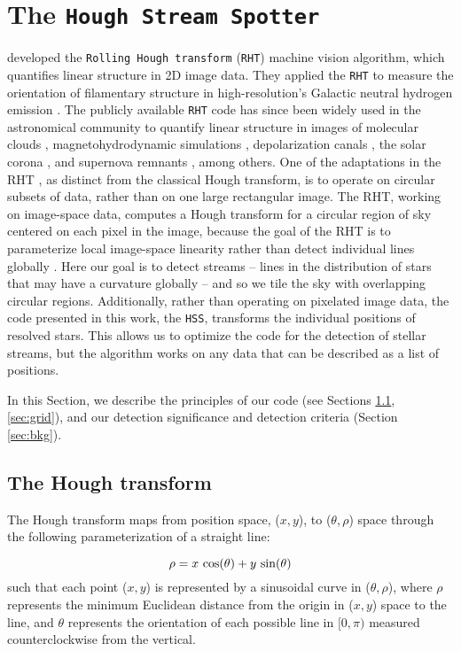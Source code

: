 \documentclass[twocolumn]{aastex631}
\begin{document}
\section{The \texttt{Hough Stream Spotter}}\label{sec:RHT}
\citet{clark14} developed the \texttt{Rolling Hough transform} (\texttt{RHT}) machine vision algorithm, which quantifies linear structure in 2D image data. They applied the \texttt{RHT} to measure the orientation of filamentary structure in high-resolution’s  Galactic neutral hydrogen emission \citep[see also][]{clark19}. The publicly available \texttt{RHT} code has since been widely used in the astronomical community to quantify linear structure in images of molecular clouds \citep{malinen2016,Panopoulou16}, magnetohydrodynamic simulations \citep{Inoue16}, depolarization canals \citep{jelic2018}, the solar corona \citep{boe2020}, and supernova remnants \citep{raymond2020}, among others. One of the adaptations in the RHT \citep[]{clark14}, as distinct from the classical Hough transform, is to operate on circular subsets of data, rather than on one large rectangular image.
The RHT, working on image-space data, computes a Hough transform for a circular region of sky centered on each pixel in the image, because the goal of the RHT is to parameterize local image-space linearity rather than detect individual lines globally \citep[see][for details]{clark14}. Here our goal is to detect streams -- lines in the distribution of stars that may have a curvature globally -- and so we tile the sky with overlapping circular regions. 
Additionally, rather than operating on pixelated image data, the code presented in this work, the \texttt{HSS}, transforms the individual positions of resolved stars. This allows us to optimize the code for the detection of stellar streams, but the algorithm works on any data that can be described as a list of positions. 

In this Section, we describe the principles of our code (see Sections \ref{sec:HT}, \ref{sec:grid}), and our detection significance and detection criteria (Section \ref{sec:bkg}). 

\subsection{The Hough transform}\label{sec:HT}
The Hough transform \citep{hough62} maps from position space, ($x,y$), to ($\theta,\rho$) space through the following parameterization of a straight line: 

\begin{equation}
    \rho = x~{\rm cos}(\theta) + y~{\rm sin}(\theta)
    \label{eq:HT}
\end{equation}
such that each point ($x,y$) is represented by a sinusoidal curve in ($\theta,\rho$), where $\rho$ represents the minimum Euclidean distance from the origin in ($x,y$) space to the line, and $\theta$ represents the orientation of each possible line in $[0, \pi)$ measured counterclockwise from the vertical.
\end{document}
